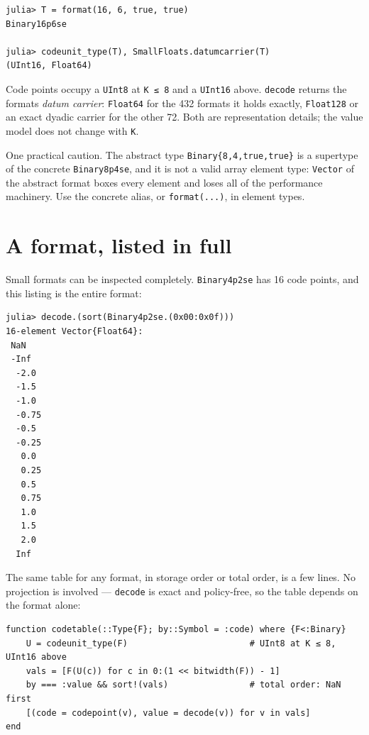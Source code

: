 \begin{verbatim}
julia> T = format(16, 6, true, true)
Binary16p6se

julia> codeunit_type(T), SmallFloats.datumcarrier(T)
(UInt16, Float64)
\end{verbatim}



Code points occupy a \texttt{UInt8} at \texttt{K ≤ 8} and a \texttt{UInt16} above. \texttt{decode} returns the format{\textquotesingle}s \emph{datum carrier}: \texttt{Float64} for the 432 formats it holds exactly, \texttt{Float128} or an exact dyadic carrier for the other 72. Both are representation details; the value model does not change with \texttt{K}.



One practical caution. The abstract type \texttt{Binary\{8,4,true,true\}} is a supertype of the concrete \texttt{Binary8p4se}, and it is not a valid array element type: \texttt{Vector} of the abstract format boxes every element and loses all of the performance machinery. Use the concrete alias, or \texttt{format(...)}, in element types.



\section{A format, listed in full}



\label{981248173416556099}{}


Small formats can be inspected completely. \texttt{Binary4p2se} has 16 code points, and this listing is the entire format:




\begin{verbatim}
julia> decode.(sort(Binary4p2se.(0x00:0x0f)))
16-element Vector{Float64}:
 NaN
 -Inf
  -2.0
  -1.5
  -1.0
  -0.75
  -0.5
  -0.25
   0.0
   0.25
   0.5
   0.75
   1.0
   1.5
   2.0
  Inf
\end{verbatim}



The same table for any format, in storage order or total order, is a few lines. No projection is involved — \texttt{decode} is exact and policy-free, so the table depends on the format alone:




\begin{verbatim}
function codetable(::Type{F}; by::Symbol = :code) where {F<:Binary}
    U = codeunit_type(F)                        # UInt8 at K ≤ 8, UInt16 above
    vals = [F(U(c)) for c in 0:(1 << bitwidth(F)) - 1]
    by === :value && sort!(vals)                # total order: NaN first
    [(code = codepoint(v), value = decode(v)) for v in vals]
end
\end{verbatim}




